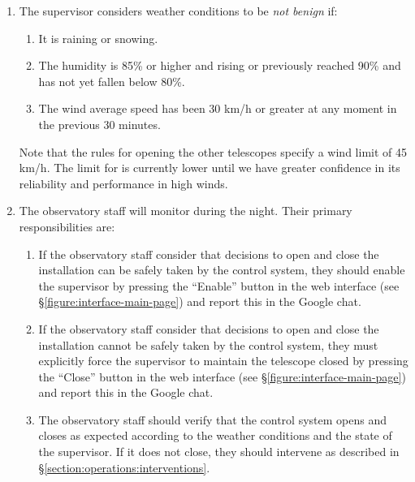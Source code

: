 \begin{enumerate}
        If the supervisor is enabled and the weather conditions are not benign, the control system will not open (if closed) or will close (if open).

        If the supervisor is enabled and the weather conditions change from not benign to benign, the control system will open partially to cool (between half and hour before sunset and sunset) or open completely to observe (between sunset and the end of morning astronomical twilight).

    \item
        The supervisor considers weather conditions to be \emph{not benign} if:
        \begin{enumerate}
            \item It is raining or snowing.
            \item The humidity is 85\% or higher and rising or previously reached 90\% and has not yet fallen below 80\%.
            \item The wind average speed has been 30 km/h or greater at any moment in the previous 30 minutes.
        \end{enumerate}
        Note that the rules for opening the other telescopes specify a wind limit of 45 km/h. The limit for {\projectname} is currently lower until we have greater confidence in its reliability and performance in high winds.

    \item
        The observatory staff will monitor {\projectname} during the night. Their primary responsibilities are:
        \begin{enumerate}
            \item If the observatory staff consider that decisions to open and close the installation can be safely taken by the control system, they should enable the supervisor by pressing the “Enable” button in the web interface (see \S\ref{figure:interface-main-page}) and report this in the Google chat.
            \item If the observatory staff consider that decisions to open and close the installation cannot be safely taken by the control system, they must explicitly force the supervisor to maintain the telescope closed by pressing the “Close” button in the web interface (see \S\ref{figure:interface-main-page}) and report this in the Google chat.
            \item
                The observatory staff should verify that the control system opens and closes as expected according to the weather conditions and the state of the supervisor. If it does not close, they should intervene as described in \S\ref{section:operations:interventions}.


\end{enumerate}
\end{enumerate}
